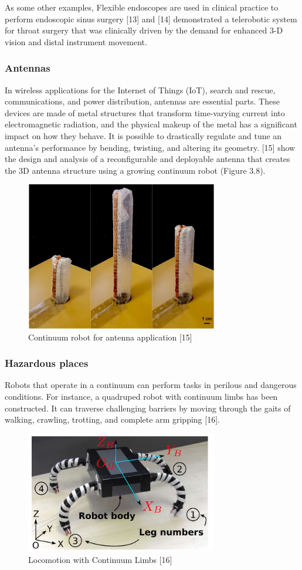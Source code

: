 \documentclass[12pt,twoside,a4]{mwbk}
\begin{document}
\noindent As some other examples, Flexible endoscopes are used in clinical practice to perform endoscopic sinus surgery [13] and [14] demonstrated a telerobotic system for throat surgery that was clinically driven by the demand for enhanced 3-D vision and distal instrument movement.

\subsubsection{Antennas}
In wireless applications for the Internet of Things (IoT), search and rescue, communications, and power distribution, antennas are essential parts. These devices are made of metal structures that transform time-varying current into electromagnetic radiation, and the physical makeup of the metal has a significant impact on how they behave. It is possible to drastically regulate and tune an antenna's performance by bending, twisting, and altering its geometry. [15] show the design and analysis of a reconfigurable and deployable antenna that creates the 3D antenna structure using a growing continuum robot (Figure 3.8).
\begin{figure}[h]
    \centering
    \includegraphics[width=8.4cm, height=6.5cm]{ant.JPG}
    \caption{Continuum robot for antenna application [15]}
\end{figure}

\subsubsection{Hazardous places}
Robots that operate in a continuum can perform tasks in perilous and dangerous conditions. For instance, a quadruped robot with continuum limbs has been constructed. It can traverse challenging barriers by moving through the gaits of walking, crawling, trotting, and complete arm gripping [16].
\begin{figure}[h]
    \centering
    \includegraphics[width=8.4cm, height=5.3cm]{hazardous.JPG}
    \caption{Locomotion with Continuum Limbs [16]}
\end{figure}
\end{document}
